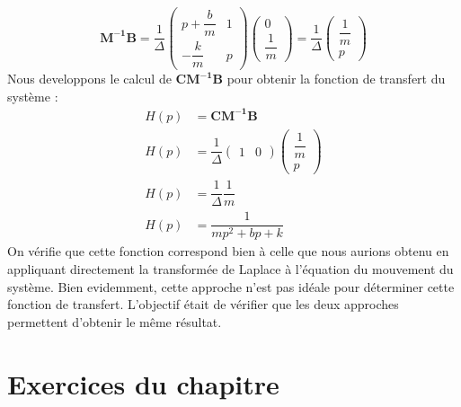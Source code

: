 \[
    \boldsymbol{M^{-1}}\boldsymbol{B}=
    \dfrac{1}{\Delta}
     \begin{pmatrix}
        p+\dfrac{b}{m} & 1 \\[1em]
        -\dfrac{k}{m} & p
    \end{pmatrix}
    \begin{pmatrix} 0 \\[1em] \dfrac{1}{m} \end{pmatrix}=
     \dfrac{1}{\Delta}
     \begin{pmatrix} \dfrac{1}{m} \\[1em] p \end{pmatrix}
\]
Nous developpons le calcul de $\boldsymbol{C}\boldsymbol{M^{-1}}\boldsymbol{B}$ 
pour obtenir la fonction de transfert du système :
\begin{align*}
    H(p)&=\boldsymbol{C}\boldsymbol{M^{-1}}\boldsymbol{B} \\
    H(p)&=\dfrac{1}{\Delta}
    \begin{pmatrix} 1 & 0 \end{pmatrix}
    \begin{pmatrix} \dfrac{1}{m} \\[1em] p \end{pmatrix}\\
    H(p)&=\dfrac{1}{\Delta} \dfrac{1}{m}\\
    H(p)&=\dfrac{1}{mp^2+bp+k}
\end{align*}
On vérifie que cette fonction correspond bien à celle que nous aurions obtenu
en appliquant directement la transformée de Laplace à l'équation du mouvement
du système.
Bien evidemment, cette approche n'est pas idéale pour déterminer cette fonction
de transfert. L'objectif était de vérifier que les deux approches permettent
d'obtenir le même résultat.
\newpage
\section{Exercices du chapitre}
\small

\setcounter{numexos}{0}
\normalsize
\newpage
\restoregeometry
\captionsetup{width=0.9\linewidth}
